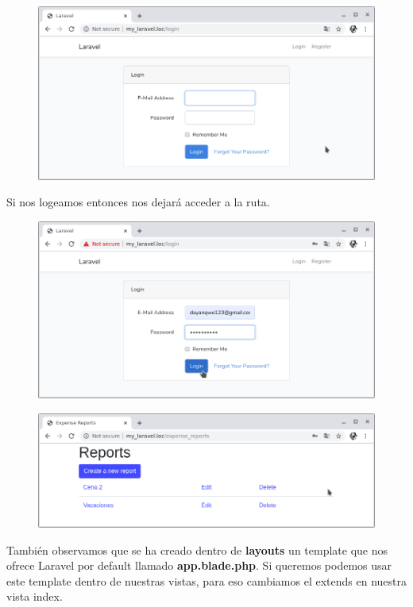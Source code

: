 \documentclass{article}
\begin{document}
\begin{figure}[h!]
  \centering
  \includegraphics[scale=0.5]{./Pictures/133_login_again.png}
\end{figure}

Si nos logeamos entonces nos dejará acceder a la ruta.

\begin{figure}[h!]
  \centering
  \includegraphics[scale=0.5]{./Pictures/134_login_user.png}
\end{figure}

\begin{figure}[h!]
  \centering
  \includegraphics[scale=0.5]{./Pictures/135_reports_ok.png}
\end{figure}

También observamos que se ha creado dentro de \textbf{layouts} un template que
nos ofrece Laravel por default llamado \textbf{app.blade.php}. Si queremos
podemos usar este template dentro de nuestras vistas, para eso cambiamos el
extends en nuestra vista index.\\
\end{document}
